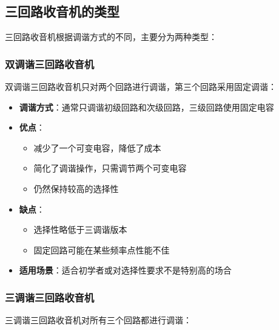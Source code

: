 \documentclass[12pt,UTF8]{ctexbook}
\begin{document}
\subsection{三回路收音机的类型}

三回路收音机根据调谐方式的不同，主要分为两种类型：

\subsubsection{双调谐三回路收音机}

双调谐三回路收音机只对两个回路进行调谐，第三个回路采用固定调谐：

\begin{itemize}[leftmargin=3.5em]
    \item \textbf{调谐方式}：通常只调谐初级回路和次级回路，三级回路使用固定电容
    \item \textbf{优点}：
        \begin{itemize}[leftmargin=3.5em]
        \item 减少了一个可变电容，降低了成本
        \item 简化了调谐操作，只需调节两个可变电容
        \item 仍然保持较高的选择性
        \end{itemize}
    \item \textbf{缺点}：
        \begin{itemize}[leftmargin=3.5em]
        \item 选择性略低于三调谐版本
        \item 固定回路可能在某些频率点性能不佳
        \end{itemize}
    \item \textbf{适用场景}：适合初学者或对选择性要求不是特别高的场合
\end{itemize}

\subsubsection{三调谐三回路收音机}

三调谐三回路收音机对所有三个回路都进行调谐：
\end{document}
